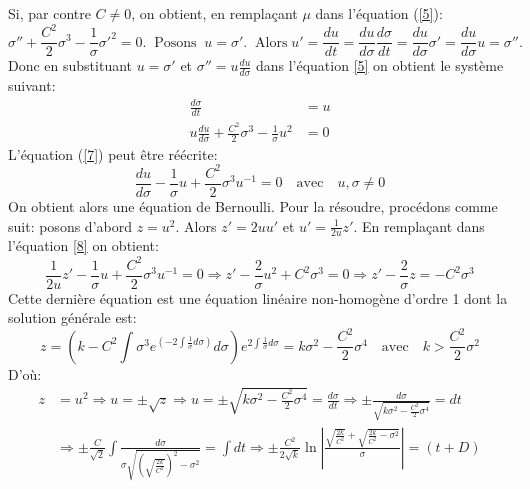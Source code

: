\documentclass[11pt, letterpaper]{article}
\begin{document}
	Si, par contre $C\neq 0$, on obtient, en remplaçant $\mu$ dans l'équation (\ref{5}): 
	\begin{equation*}
	   \sigma''+\frac{C^2}{2}\sigma^3-\frac{1}{\sigma}\sigma'^2=0.\;\;\text{Posons}\;\;u=\sigma'.\;\;\text{Alors}\;u'=\frac{du}{dt}=\frac{du}{d\sigma}\frac{d\sigma}{dt}=\frac{du}{d\sigma}\sigma'=\frac{du}{d\sigma}u=\sigma''.
	\end{equation*}
	Donc en substituant $u=\sigma'$ et $\sigma''=u\frac{du}{d\sigma}$ dans l'équation \eqref{5} on obtient le système suivant:
	\begin{align}
	    \frac{d\sigma}{dt}&=u\label{6}\\
	    u\frac{du}{d\sigma}+\frac{C^2}{2}\sigma^3-\frac{1}{\sigma}u^2&=0\label{7} 
	\end{align}
	L'équation (\ref{7}) peut être réécrite:
	\begin{equation}
	    \frac{du}{d\sigma}-\frac{1}{\sigma}u+\frac{C^2}{2}\sigma^3u^{-1}=0\label{8}\quad\text{avec}\quad u, \sigma\neq0
	\end{equation}
	On obtient alors une équation de Bernoulli. Pour la résoudre, procédons comme suit: posons d'abord $z=u^2$. Alors $z'=2uu'$ et $u'=\frac{1}{2u}z'$. En remplaçant dans l'équation \eqref{8}  on obtient:
	\begin{equation*} 
	    \frac{1}{2u}z'-\frac{1}{\sigma}u+\frac{C^2}{2}\sigma^3u^{-1}=0\Longrightarrow z'-\frac{2}{\sigma}u^2+C^2\sigma^3=0\Longrightarrow z'-\frac{2}{\sigma}z=-C^2\sigma^3
	\end{equation*}
	Cette dernière équation est une équation linéaire non-homogène d'ordre 1 dont la solution générale est:
	\begin{equation*}
	    z=\left(k-C^2\int\sigma^3e^{\left(-2\int\frac{1}{\sigma}d\sigma\right)}d\sigma\right)e^{2\int\frac{1}{\sigma}d\sigma}=k\sigma^2-\frac{C^2}{2}\sigma^4\quad\text{avec}\quad k>\frac{C^2}{2}\sigma^2
	\end{equation*}
	D'où:
	\begin{align*}
	   z&=u^2\Longrightarrow u=\pm\sqrt{z}\Longrightarrow u=\pm\sqrt{k\sigma^2-\frac{C^2}{2}\sigma^4}=\frac{d\sigma}{dt}\Longrightarrow\pm\frac{d\sigma}{\sqrt{k\sigma^2-\frac{C^2}{2}\sigma^4}}=dt\\
	   &\Longrightarrow\pm\frac{C}{\sqrt{2}}\int\frac{d\sigma}{\sigma\sqrt{\left(\sqrt{\frac{2k}{C^2}}\right)^2-\sigma^2}}=\int dt\Longrightarrow\pm\frac{C^2}{2\sqrt{k}}\ln\left|\frac{\sqrt{\frac{2k}{C^2}}+\sqrt{\frac{2k}{C^2}-\sigma^2}}{\sigma}\right|=(t+D)
	\end{align*}
\end{document}
